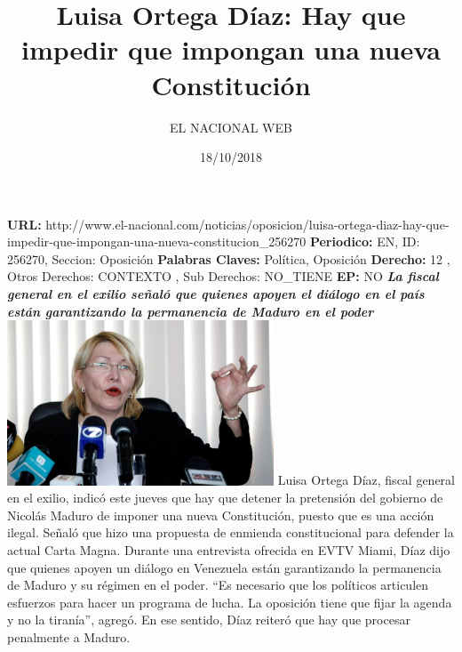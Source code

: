 \documentclass{article}%
\title{\textbf{Luisa Ortega Díaz: Hay que impedir que impongan una nueva Constitución}}%
\author{EL NACIONAL WEB}%
\date{18/10/2018}%
\begin{document}
%
\normalsize%
\maketitle%
\textbf{URL: }%
http://www.el{-}nacional.com/noticias/oposicion/luisa{-}ortega{-}diaz{-}hay{-}que{-}impedir{-}que{-}impongan{-}una{-}nueva{-}constitucion\_256270\newline%
%
\textbf{Periodico: }%
EN, %
ID: %
256270, %
Seccion: %
Oposición\newline%
%
\textbf{Palabras Claves: }%
Política, Oposición\newline%
%
\textbf{Derecho: }%
12%
, Otros Derechos: %
CONTEXTO%
, Sub Derechos: %
NO\_TIENE%
\newline%
%
\textbf{EP: }%
NO\newline%
\newline%
%
\textbf{\textit{La fiscal general en el exilio señaló que quienes apoyen el diálogo en el país están garantizando la permanencia de Maduro en el poder~}}%
\newline%
\newline%
%
\includegraphics[width=300px]{211.jpg}%
\newline%
%
Luisa Ortega Díaz, fiscal general en el exilio, indicó este jueves que hay que detener la pretensión del gobierno de Nicolás Maduro de imponer una nueva Constitución, puesto que es una acción ilegal.%
\newline%
%
Señaló que hizo una propuesta de enmienda constitucional para defender la actual Carta Magna.%
\newline%
%
Durante una entrevista ofrecida en EVTV Miami, Díaz dijo que quienes apoyen un diálogo en Venezuela están garantizando la permanencia de Maduro y su régimen en el poder.%
\newline%
%
“Es necesario que los políticos articulen esfuerzos para hacer un programa de lucha. La oposición tiene que fijar la agenda y no la tiranía”, agregó.%
\newline%
%
En ese sentido, Díaz reiteró que hay que procesar penalmente a Maduro.%
\newline%
%
\end{document}
